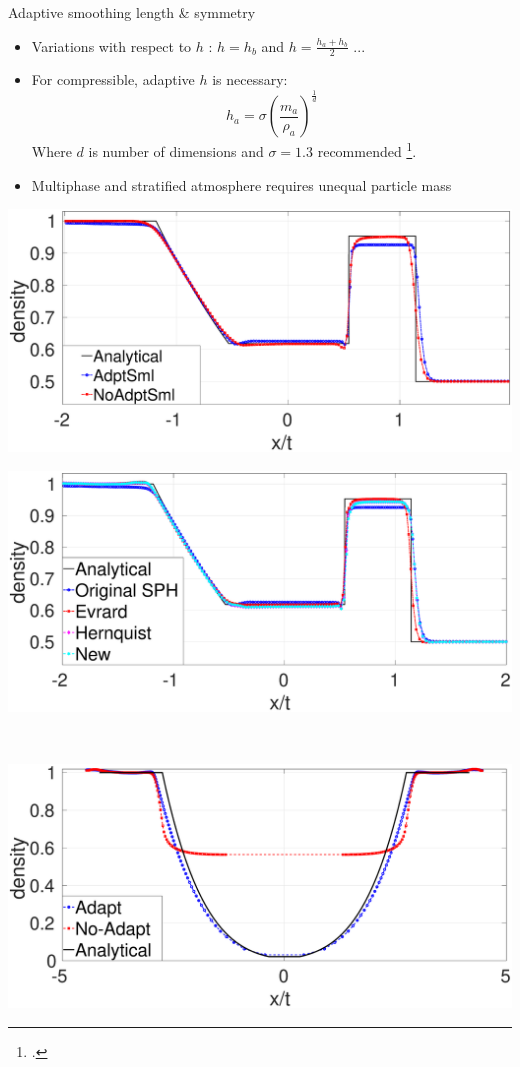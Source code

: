 \documentclass{beamer}
\begin{document}
\begin{frame}{Adaptive smoothing length \& symmetry}
\begin{itemize}
\item Variations with respect to $h$ :
$h=h_b$ and $h= \frac{h_a+h_b}{2}$ ...
\item For compressible, adaptive $h$ is necessary:
\begin{equation}
h_a = \sigma \left(\frac{m_a}{\rho_a}\right)^{\frac{1}{d}}
\end{equation}
Where $d$ is number of dimensions and $\sigma=1.3 $ recommended  \footcite{gingold1978binary}.
\item Multiphase and stratified atmosphere requires unequal particle mass
\end{itemize}
\begin{minipage}{.43\textwidth}
        \centering
        \includegraphics[width=0.88 \textwidth]{./Chapter-3/Figures/Adapt-NoAdapt-NoSMDM}
\end{minipage}%
\begin{minipage}{.43\textwidth}
        \centering
        \includegraphics[width=0.88 \textwidth]{./Chapter-3/Figures/SM-Adapt-MEs}
\end{minipage}%
\\
\center
\begin{minipage}{.43\textwidth}
        \centering
        \includegraphics[width=0.88 \textwidth]{./Chapter-3/Figures/Sjogreen-adptVSno-d}

\end{minipage}
\end{frame}
\end{document}
